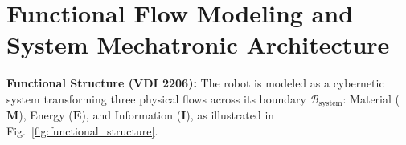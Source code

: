 \documentclass[10pt,a4paper]{article}
\begin{document}
\vspace{-0.4em}
\section{Functional Flow Modeling and System Mechatronic Architecture}
\label{sec:architecture}
\vspace{-0.2em}
\textbf{Functional Structure (VDI 2206):} The robot is modeled as a cybernetic system transforming three physical flows across its boundary $\mathcal{B}_{\text{system}}$: Material ($\mathbf{M}$), Energy ($\mathbf{E}$), and Information ($\mathbf{I}$), as illustrated in Fig.~\ref{fig:functional_structure}.
\end{document}
